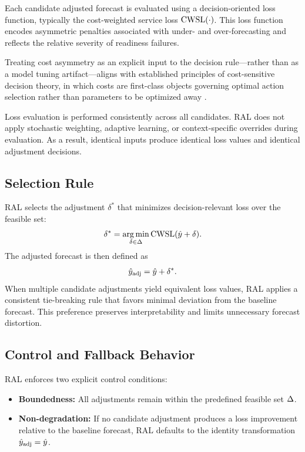 Each candidate adjusted forecast is evaluated using a decision-oriented loss
function, typically the cost-weighted service loss \(\text{CWSL}(\cdot)\). This loss
function encodes asymmetric penalties associated with under- and over-forecasting
and reflects the relative severity of readiness failures.

Treating cost asymmetry as an explicit input to the decision rule—rather than as a
model tuning artifact—aligns with established principles of cost-sensitive
decision theory, in which costs are first-class objects governing optimal action
selection rather than parameters to be optimized away \citep{elkan2001}.

Loss evaluation is performed consistently across all candidates. RAL does not
apply stochastic weighting, adaptive learning, or context-specific overrides
during evaluation. As a result, identical inputs produce identical loss values and
identical adjustment decisions.

\subsection{Selection Rule}

RAL selects the adjustment \(\delta^{*}\) that minimizes decision-relevant loss
over the feasible set:
\[
\delta^{*}
=
\operatorname*{arg\,min}_{\delta \in \Delta}
\text{CWSL}(\hat{y} + \delta).
\]
The adjusted forecast is then defined as
\[
\hat{y}_{\text{adj}} = \hat{y} + \delta^{*}.
\]
When multiple candidate adjustments yield equivalent loss values, RAL applies a
consistent tie-breaking rule that favors minimal deviation from the baseline
forecast. This preference preserves interpretability and limits unnecessary
forecast distortion.

\subsection{Control and Fallback Behavior}

RAL enforces two explicit control conditions:
\begin{itemize}[leftmargin=*]
    \item \textbf{Boundedness:} All adjustments remain within the predefined
    feasible set \(\Delta\).
    \item \textbf{Non-degradation:} If no candidate adjustment produces a loss
    improvement relative to the baseline forecast, RAL defaults to the identity
    transformation \(\hat{y}_{\text{adj}} = \hat{y}\).
\end{itemize}

